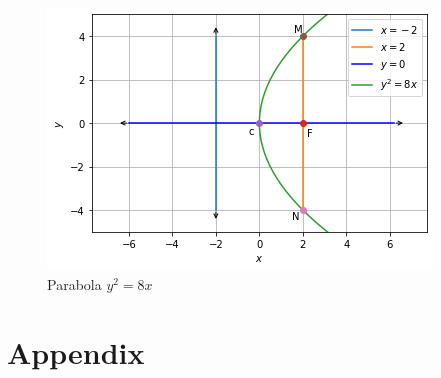 \documentclass[journal,12pt,twocolumn]{IEEEtran}
\begin{document}
\begin{figure}[!ht]
\centering
\includegraphics[width=\columnwidth]{Figure6}
\caption{Parabola $y^2=8x$ }
\label{fig:parabola}	
\end{figure}

\section{Appendix}
\end{document}
